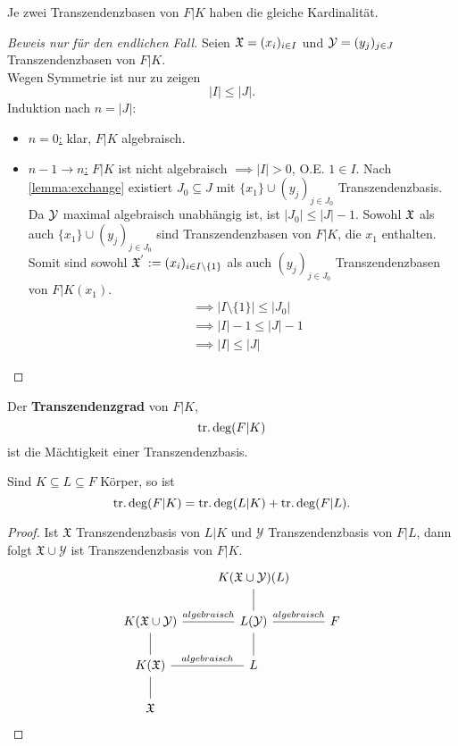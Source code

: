 \begin{satz}[Steinitz, 1910]
    Je zwei Transzendenzbasen von $F|K$ haben die gleiche Kardinalität.
\end{satz}

\begin{proof}[Beweis nur für den endlichen Fall]
    Seien $\mathfrak{X}=(x_i)_{i \in I}$ und $\mathcal{Y} = (y_j)_{j \in J}$ Transzendenzbasen von $F|K$.\\
    Wegen Symmetrie ist nur zu zeigen
    $$ |I| \leq |J|. $$
    Induktion nach $n = |J|$:
    \begin{itemize}[label=]
        \item \underline{$n=0$:} klar, $F|K$ algebraisch.
        \item  \underline{$n-1 \to n$:} $F|K$ ist nicht algebraisch 
        $\implies |I| > 0$, O.E. $1 \in I$. Nach \cref{lemma:exchange} existiert $J_0 \subseteq J$ mit
        $\{x_1\} \cup (y_j)_{j\in J_0}$ Transzendenzbasis. 
        Da $\mathcal{Y}$ maximal algebraisch unabhängig ist, ist $|J_0| \leq |J| -1$.
        Sowohl $\mathfrak{X}$ als auch $\{x_1\} \cup (y_j)_{j \in J_0}$ sind Transzendenzbasen von $F|K$, die $x_1$ enthalten.
        Somit sind sowohl $\mathfrak{X}^{'}:= (x_i)_{i \in I\setminus \{1\}}$ als auch $(y_j)_{j \in J_0}$ Transzendenzbasen von $F|K(x_1)$.
        \begin{align*}
            &\implies |I \setminus\{1\}| \leq |J_0| \\
            &\implies |I| -1 \leq |J| -1 \\
            &\implies |I| \leq |J|            
        \end{align*}
    \end{itemize}
\end{proof}

\begin{definition}
    Der \textbf{Transzendenzgrad} von $F|K$, 
    $$ \operatorname{tr.deg}(F|K) $$ ist die Mächtigkeit einer Transzendenzbasis.
\end{definition}

\begin{korollar}
    Sind $K \subseteq L \subseteq F$ Körper, so ist 
    $$ \operatorname{tr.deg}(F|K) = \operatorname{tr.deg}(L|K) + \operatorname{tr.deg}(F|L). $$
\end{korollar}
\begin{proof}
    Ist $\mathfrak{X}$ Transzendenzbasis von $L|K$ und $\mathcal{Y}$ Transzendenzbasis von $F|L$, dann folgt
    $ \mathfrak{X} \cup \mathcal{Y}$ ist Transzendenzbasis von $F|K$.
    $$\begin{tikzcd}
        & K(\mathfrak{X} \cup \mathcal{Y})(L) & \\
        K(\mathfrak{X} \cup \mathcal{Y}) \rar[dash]{algebraisch} & L(\mathcal{Y}) \uar[dash] \rar[dash]{algebraisch} & F \\
        K(\mathfrak{X}) \uar[dash] \rar[dash]{algebraisch}& L \uar[dash] & \\
        \mathfrak{X} \uar[dash] & &
    \end{tikzcd}$$
\end{proof}

